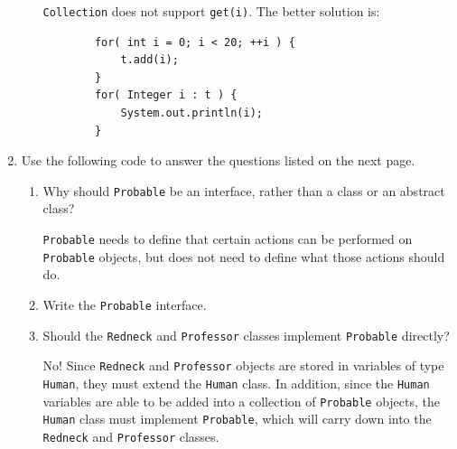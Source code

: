 \documentclass[11pt]{article}
\newenvironment{answer}{\large\lstset{basicstyle=\tiny\ttfamily}\color{white}}{}
\newenvironment{answer}{\large\lstset{basicstyle=\large\ttfamily}\color{red}}{}
\begin{document}
\begin{enumerate}
\begin{enumerate}
    \begin{answer}
    \texttt{Collection} does not support \texttt{get(i)}. The better solution is:
    \begin{lstlisting}
        for( int i = 0; i < 20; ++i ) {
            t.add(i);
        }
        for( Integer i : t ) {
            System.out.println(i);
        }

    \end{lstlisting}
    \end{answer}

    \end{enumerate}
    
\pagebreak
\item Use the following code to answer the questions listed on the next page.



\pagebreak
\begin{enumerate}
\item Why should \texttt{Probable} be an interface, rather than a class or an abstract class?

\begin{answer}
\texttt{Probable} needs to define that certain actions can be performed on \texttt{Probable} objects, but does not need to define what those actions should do.
\end{answer}

\item Write the \texttt{Probable} interface.

\begin{answer}

\end{answer}

\item Should the \texttt{Redneck} and \texttt{Professor} classes implement \texttt{Probable} directly?

\begin{answer}
No! Since \texttt{Redneck} and \texttt{Professor} objects are stored in variables of type \texttt{Human}, they must extend the \texttt{Human} class.
In addition, since the \texttt{Human} variables are able to be added into a collection of \texttt{Probable} objects, the \texttt{Human} class must implement \texttt{Probable}, which will carry down into the \texttt{Redneck} and \texttt{Professor} classes.
\end{answer}

\end{enumerate}


\end{enumerate}
\end{document}
